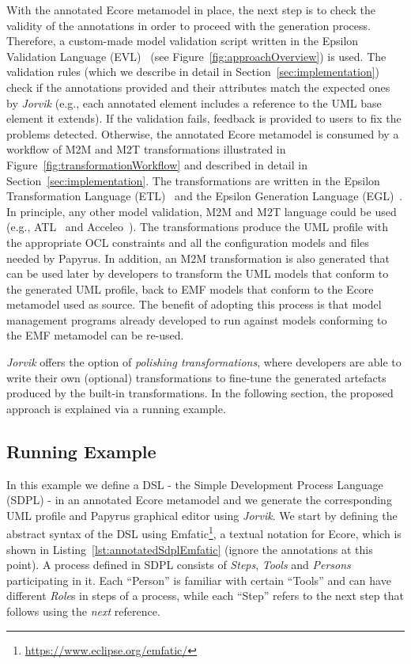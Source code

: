 With the annotated Ecore metamodel in place, the next step is to check the validity of the annotations in order to proceed with the generation process. 
Therefore, a custom-made model validation script written in the Epsilon Validation Language (EVL)~\cite{evlKolovos} (see Figure~\ref{fig:approachOverview}) is used.
The validation rules (which we describe in detail in Section~\ref{sec:implementation}) check if the annotations provided and their attributes match the expected ones by \textit{Jorvik} (e.g., each annotated element includes a reference to the UML base element it extends). 
If the validation fails, feedback is provided to users to fix the problems detected. 
Otherwise, the annotated Ecore metamodel is consumed by a workflow of M2M and M2T  transformations illustrated in Figure~\ref{fig:transformationWorkflow} and described in detail in Section~\ref{sec:implementation}. 
The transformations are written in the Epsilon Transformation Language (ETL)~\cite{Kolovos2008} and the Epsilon Generation Language (EGL)~\cite{rose2008egl}. 
In principle, any other model validation, M2M and M2T language could be used (e.g., ATL~\cite{jouault2006atl} and Acceleo~\cite{}). 
The transformations produce the UML profile with the appropriate OCL constraints and all the configuration models and files needed by Papyrus. 
In addition, an M2M transformation is also generated that can be used later by developers to transform the UML models that conform to the generated UML profile, back to EMF models that conform to the Ecore metamodel used as source. 
The benefit of adopting this process is that model management programs already developed to run against models conforming to the EMF metamodel can be re-used.

\textit{Jorvik} offers the option of \textit{polishing transformations}, where developers are able to write their own (optional) transformations to fine-tune the generated artefacts produced by the built-in transformations. 
In the following section, the proposed approach is explained via a running example.

\subsection{Running Example}
\label{sec:example}
In this example we define a DSL - the Simple Development Process Language (SDPL) - in an annotated Ecore metamodel and we generate the corresponding UML profile and Papyrus graphical editor using \textit{Jorvik}.
We start by defining the abstract syntax of the DSL using  Emfatic\footnote{\url{https://www.eclipse.org/emfatic/}}, a textual notation for Ecore, which is shown in Listing~\ref{lst:annotatedSdplEmfatic} (ignore the annotations at this point). 
A process defined in SDPL consists of \textit{Steps}, \textit{Tools} and \textit{Persons} participating in it. 
Each ``Person'' is familiar with certain ``Tools'' and can have different \textit{Role}s in steps of a process, while each ``Step'' refers to the next step that follows using the \textit{next} reference.

